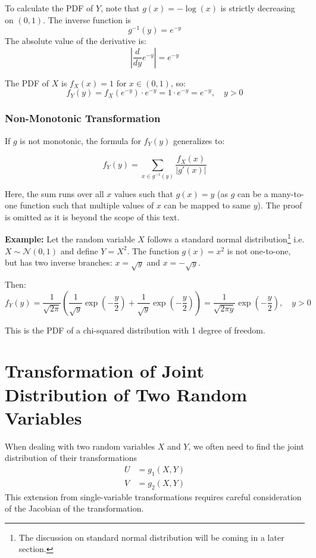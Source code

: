 \documentclass[twoside]{book}
\begin{document}
To calculate the PDF of $Y$, note that $g(x) = -\log(x)$ is strictly decreasing on $(0,1)$. The inverse function is $$g^{-1}(y) = e^{-y}$$
The absolute value of the derivative is:
\[
\left| \frac{d}{dy} e^{-y} \right| = e^{-y}
\]

The PDF of $X$ is $f_X(x) = 1$ for $x \in (0,1)$, so:
\[
f_Y(y) = f_X(e^{-y}) \cdot e^{-y} = 1 \cdot e^{-y} = e^{-y}, \quad y > 0
\]

\subsubsection*{Non-Monotonic Transformation}

If $g$ is not monotonic, the formula for $f_Y(y)$ generalizes to:
\begin{textbox}
\[
f_Y(y) = \sum_{x \in g^{-1}(y)} \frac{f_X(x)}{\left| g'(x) \right|}
\]
\end{textbox}

Here, the sum runs over all $x$ values such that $g(x) = y$ (as $g$ can be a many-to-one function such that multiple values of $x$ can be mapped to same $y$). The proof is omitted as it is beyond the scope of this text.

\vspace{2mm}

\textbf{Example:} Let the random variable $X$ follows a standard normal distribution\footnote{The discussion on standard normal distribution will be coming in a later section.} i.e. $X \sim \mathcal{N}(0,1)$ and define $Y = X^2$. The function $g(x) = x^2$ is not one-to-one, but has two inverse branches: $x = \sqrt{y}$ and $x = -\sqrt{y}$.

Then:
\[
f_Y(y) = \frac{1}{\sqrt{2\pi}} \left( \frac{1}{\sqrt{y}} \exp\left( -\frac{y}{2} \right) + \frac{1}{\sqrt{y}} \exp\left( -\frac{y}{2} \right) \right) = \frac{1}{\sqrt{2\pi y}} \exp\left( -\frac{y}{2} \right), \quad y > 0
\]

This is the PDF of a chi-squared distribution with 1 degree of freedom.

\section{Transformation of Joint Distribution of Two Random Variables}

When dealing with two random variables $X$ and $Y$, we often need to find the joint distribution of their transformations
\begin{align*}
U &= g_1(X,Y)\\
V &= g_2(X,Y)
\end{align*}
This extension from single-variable transformations requires careful consideration of the Jacobian of the transformation.
\end{document}
